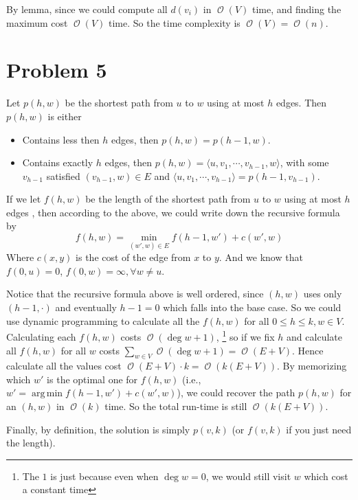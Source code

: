 \documentclass[12pt, a4paper]{article}
\DeclareMathOperator*{\argmin}{arg\,min}
\newcommand{\opord}{\operatorname{\mathcal{O}}}
\newcommand{\ord}[1]{\opord\left(#1\right)}
\begin{document}
By lemma, since we could compute all $d(v_i)$ in $\ord{V}$ time, and finding the maximum
cost $\ord{V}$ time. So the time complexity is $\ord{V} = \ord{n}$.

\section{Problem 5}
Let $p(h, w)$ be the shortest path from $u$ to $w$ using at most $h$ edges.
Then $p(h, w)$ is either
\begin{itemize}
  \item Contains less then $h$ edges, then $p(h, w) = p(h-1, w)$.
  \item Contains exactly $h$ edges, then $p(h, w) = \langle u , v_1,
    \cdots, v_{h-1}, w \rangle$, with some $v_{h-1}$ satisfied $(v_{h-1}, w) \in E$ and
    $\langle u, v_1, \cdots, v_{h-1} \rangle = p(h-1, v_{h-1})$.
\end{itemize}
If we let $f(h, w)$ be the length of the shortest path from $u$ to $w$ using at most $h$
edges , then according to the above, we could write down the recursive formula by
\[ f(h, w) = \min_{(w', w) \in E} f(h-1, w') + c(w', w) \]
Where $c(x, y)$ is the cost of the edge from $x$ to $y$.
And we know that $f(0, u) = 0$, $f(0, w) = \infty, \forall w \neq u$.

Notice that the recursive formula above is well ordered, since $(h, w)$ uses only
$(h-1, \cdot)$ and eventually $h-1 = 0$ which falls into the base case. So we could
use dynamic programming to calculate all the $f(h, w)$ for all $0 \leq h \leq k, w \in V$.
Calculating each $f(h, w)$ costs $\ord{\deg w + 1}$, \footnote{The $1$ is just because even when
  $\deg w = 0$, we would still visit $w$ which cost a constant time}
so if we fix $h$ and calculate all $f(h, w)$
for all $w$ costs $\sum_{w \in V} \ord{\deg w + 1} = \ord{E + V}$. Hence calculate all the values
cost $\ord{E+V} \cdot k = \ord{k(E + V)}$. By memorizing which $w'$ is the optimal one for $f(h, w)$
(i.e., $w' = \argmin f(h-1, w') + c(w', w)$), we could recover the path $p(h, w)$ for an
$(h, w)$ in $\ord{k}$ time.  So the total run-time is still $\ord{k(E + V)}$.

Finally, by definition, the solution is simply $p(v, k)$ (or $f(v, k)$ if you just need the length). 
\end{document}
